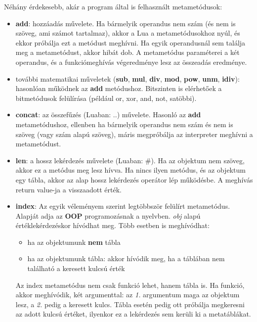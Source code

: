 Néhány érdekesebb, akár a program által is felhasznált metametódusok:
\begin{itemize}
	\item \detokenize{__}\textbf{add}: hozzáadás művelete. Ha bármelyik operandus nem szám (és nem is szöveg, ami számot tartalmaz), akkor a Lua a metametódusokhoz nyúl, és ekkor próbálja ezt a metódust meghívni. Ha egyik operandusnál sem találja meg a metametódust, akkor hibát dob. A metametódus paraméterei a két operandus, és a funkciómeghívás végeredménye lesz az összeadás eredménye.
	\item további matematikai műveletek (\detokenize{__}\textbf{sub}, \detokenize{__}\textbf{mul}, \detokenize{__}\textbf{div}, \detokenize{__}\textbf{mod}, \detokenize{__}\textbf{pow}, \detokenize{__}\textbf{unm}, \detokenize{__}\textbf{idiv}): hasonlóan működnek az \detokenize{__}\textbf{add} metódushoz. Bitszinten is elérhetőek a bitmetódusok felülírása (például or, xor, and, not, satöbbi).
	\item \detokenize{__}\textbf{concat}: az összefűzés (Luaban: ..) művelete. Hasonló az \detokenize{__}\textbf{add} metametódushoz, ellenben ha bármelyik operandus nem szám és nem is szöveg (vagy szám alapú szöveg), máris megpróbálja az interpreter meghívni a metametódust.
	\item \detokenize{__}\textbf{len}: a hossz lekérdezés művelete (Luaban: \#). Ha az objektum nem szöveg, akkor ez a metódus meg lesz hívva. Ha nincs ilyen metódus, és az objektum egy tábla, akkor az alap hossz lekérdezés operátor lép működésbe. A meghívás return value-ja a visszaadott érték.
	\pagebreak
	\item \detokenize{__}\textbf{index}: Az egyik véleményem szerint legtöbbször felülírt metametódus. Alapját adja az \textbf{OOP} programozásnak a nyelvben. \textit{obj}\detokenize{[key]} alapú értéklekérdezéskor hívódhat meg. Több esetben is meghívódhat:
		\begin{itemize}
			\item ha az objektumunk \textbf{nem} tábla
			\item ha az objektumunk tábla: akkor hívódik meg, ha a táblában nem található a keresett kulcsú érték
		\end{itemize} Az index metametódus nem csak funkció lehet, hanem tábla is. Ha funkció, akkor meghívódik, két argumenttal: az \textit{1.} argumentum maga az objektum lesz, a \textit{2.} pedig a keresett kulcs. Tábla esetén pedig ott próbálja megkeresni az adott kulcsú értéket, ilyenkor ez a lekérdezés sem kerüli ki a metatáblákat.

\end{itemize}
